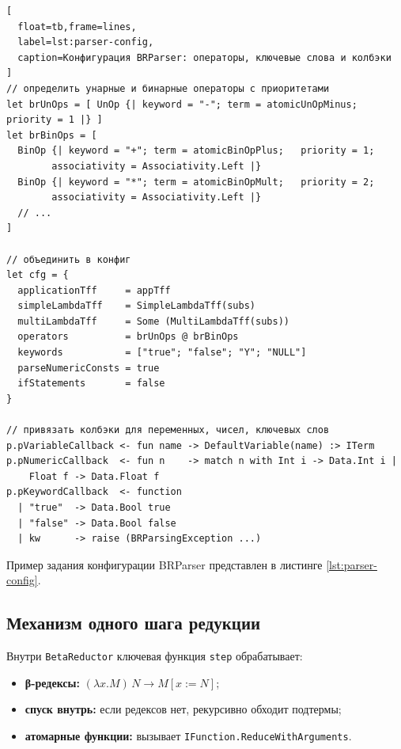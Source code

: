 \begin{itemize}
\begin{lstlisting}[
  float=tb,frame=lines,
  label=lst:parser-config,
  caption=Конфигурация BRParser: операторы, ключевые слова и колбэки
]
// определить унарные и бинарные операторы с приоритетами
let brUnOps = [ UnOp {| keyword = "-"; term = atomicUnOpMinus; priority = 1 |} ]
let brBinOps = [
  BinOp {| keyword = "+"; term = atomicBinOpPlus;   priority = 1; 
        associativity = Associativity.Left |}
  BinOp {| keyword = "*"; term = atomicBinOpMult;   priority = 2; 
        associativity = Associativity.Left |}
  // ...
]

// объединить в конфиг
let cfg = {
  applicationTff     = appTff
  simpleLambdaTff    = SimpleLambdaTff(subs)
  multiLambdaTff     = Some (MultiLambdaTff(subs))
  operators          = brUnOps @ brBinOps
  keywords           = ["true"; "false"; "Y"; "NULL"]
  parseNumericConsts = true
  ifStatements       = false
}

// привязать колбэки для переменных, чисел, ключевых слов
p.pVariableCallback <- fun name -> DefaultVariable(name) :> ITerm
p.pNumericCallback  <- fun n    -> match n with Int i -> Data.Int i | 
    Float f -> Data.Float f
p.pKeywordCallback  <- function
  | "true"  -> Data.Bool true
  | "false" -> Data.Bool false
  | kw      -> raise (BRParsingException ...)
\end{lstlisting}

Пример задания конфигурации BRParser представлен в листинге \ref{lst:parser-config}.

\subsection{Механизм одного шага редукции}
Внутри \texttt{BetaReductor} ключевая функция \texttt{step} обрабатывает:
\begin{itemize}
  \item \textbf{β-редексы:} $(\lambda x.M)\,N \to M[x:=N]$;
  \item \textbf{спуск внутрь:} если редексов нет, рекурсивно обходит подтермы;
  \item \textbf{атомарные функции:} вызывает \texttt{IFunction.ReduceWithArguments}.
\end{itemize}


\end{itemize}
